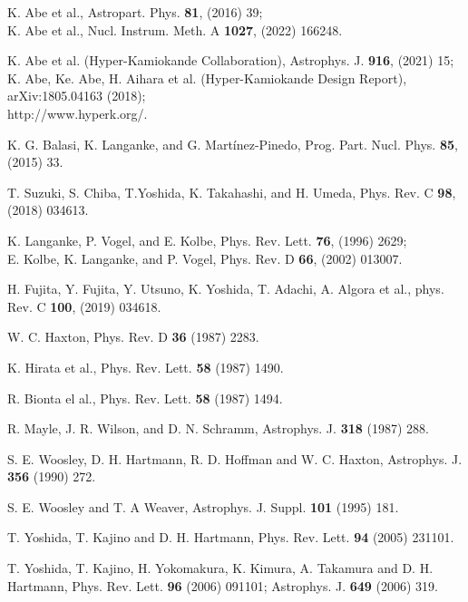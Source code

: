 \documentclass[preprint,12pt]{elsarticle}
\begin{document}
\begin{thebibliography}{99}

K. Abe et al., Astropart. Phys. {\bf 81}, (2016) 39;\\
K. Abe et al., Nucl. Instrum. Meth. A {\bf 1027}, (2022) 166248.

K. Abe et al. (Hyper-Kamiokande Collaboration), Astrophys. J. {\bf 916}, (2021) 15;\\
K. Abe, Ke. Abe, H. Aihara et al. (Hyper-Kamiokande Design Report), arXiv:1805.04163 (2018);\\
http://www.hyperk.org/.

K. G. Balasi, K. Langanke, and G. Mart\'inez-Pinedo, Prog. Part. Nucl. Phys. {\bf 85}, (2015) 33. 

T. Suzuki, S. Chiba, T.Yoshida, K. Takahashi, and H. Umeda, Phys. Rev. C {\bf 98}, (2018) 034613.

K. Langanke, P. Vogel, and E. Kolbe, Phys. Rev. Lett. {\bf 76}, (1996) 2629;\\
E. Kolbe, K. Langanke, and P. Vogel, Phys. Rev. D {\bf 66}, (2002) 013007.

H. Fujita, Y. Fujita, Y. Utsuno, K. Yoshida, T. Adachi, A. Algora et al., phys. Rev. C {\bf 100}, (2019) 034618.

W. C. Haxton, Phys. Rev. D {\bf 36} (1987) 2283.

K. Hirata et al., Phys. Rev. Lett. {\bf 58} (1987) 1490.

R. Bionta el al., Phys. Rev. Lett. {\bf 58} (1987) 1494.

R. Mayle, J. R. Wilson, and D. N. Schramm, Astrophys. J. {\bf 318} (1987) 288.

S. E. Woosley, D. H. Hartmann, R. D. Hoffman and W. C. Haxton, Astrophys. J. {\bf 356} (1990) 272.

S. E. Woosley and T. A Weaver, Astrophys. J. Suppl. {\bf 101} (1995) 181.


T. Yoshida, T. Kajino and D. H. Hartmann, Phys. Rev. Lett. {\bf 94} (2005) 231101.

T. Yoshida, T. Kajino, H. Yokomakura, K. Kimura, A. Takamura and D. H. Hartmann, Phys. Rev. Lett. {\bf 96} (2006) 091101; Astrophys. J. {\bf 649} (2006) 319.


\end{thebibliography}
\end{document}
